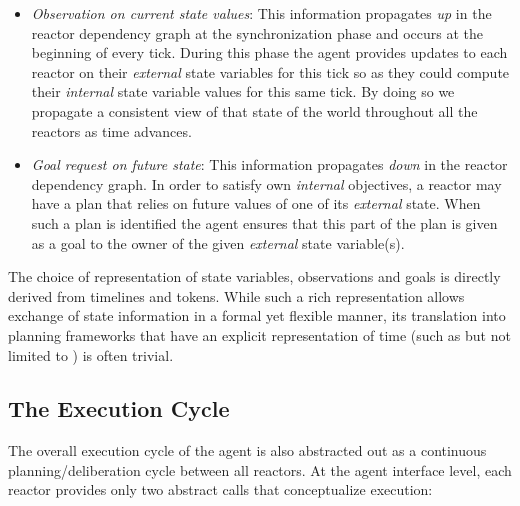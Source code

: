 \begin{itemize}

\item {\em Observation on current state values}: This information
  propagates \emph{up} in the reactor dependency graph at the
  synchronization phase and occurs at the beginning of every
  tick. During this phase the agent provides updates to each reactor
  on their {\em external} state variables for this tick so as they
  could compute their {\em internal} state variable values for this
  same tick. By doing so we propagate a consistent view of that state
  of the world throughout all the reactors as time
  advances. %

\item {\em Goal request on future state}: This information propagates
  \emph{down} in the reactor dependency graph. In order to satisfy own
  {\em internal} objectives, a reactor may have a plan that relies on
  future values of one of its {\em external} state. When such a plan
  is identified the agent ensures that this part of the plan is given
  as a goal to the owner of the given {\em external} state
  variable(s). %

\end{itemize}

The choice of representation of state variables, observations and
goals is directly derived from \eu timelines and tokens.  While such a
rich representation allows exchange of state information in a formal
yet flexible manner, its translation into planning frameworks that
have an explicit representation of time (such as but not limited to
\eu) is often trivial.

\subsection{The Execution Cycle}
\label{sec:arch:exec}

The overall execution cycle of the agent is also abstracted out as a
continuous planning/deliberation cycle between all reactors. At the
agent interface level, each reactor provides only two abstract calls
that conceptualize execution:

